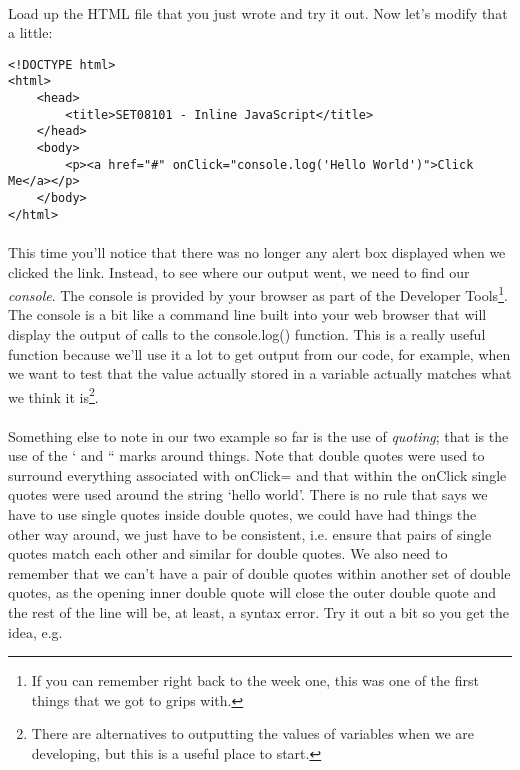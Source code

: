 \documentclass[10pt, a4paper]{article}
\begin{document}
\paragraph{} Load up the HTML file that you just wrote and try it out. Now let's modify that a little:

\begin{lstlisting}
<!DOCTYPE html>
<html>
    <head>
        <title>SET08101 - Inline JavaScript</title>
    </head>
    <body>
        <p><a href="#" onClick="console.log('Hello World')">Click Me</a></p> 
    </body>
</html>
\end{lstlisting}

\paragraph{} This time you'll notice that there was no longer any alert box displayed when we clicked the link. Instead, to see where our output went, we need to find our \emph{console}. The console is provided by your browser as part of the Developer Tools\footnote{If you can remember right back to the week one, this was one of the first things that we got to grips with.}. The console is a bit like a command line built into your web browser that will display the output of calls to the console.log() function. This is a really useful function because we'll use it a lot to get output from our code, for example, when we want to test that the value actually stored in a variable actually matches what we think it is\footnote{There are alternatives to outputting the values of variables when we are developing, but this is a useful place to start.}.

\paragraph{} Something else to note in our two example so far is the use of \emph{quoting}; that is the use of the ` and `` marks around things. Note that double quotes were used to surround everything associated with onClick= and that within the onClick single quotes were used around the string `hello world'. There is no rule that says we have to use single quotes inside double quotes, we could have had things the other way around, we just have to be consistent, i.e. ensure that pairs of single quotes match each other and similar for double quotes. We also need to remember that we can't have a pair of double quotes within another set of double quotes, as the opening inner double quote will close the outer double quote and the rest of the line will be, at least, a syntax error. Try it out a bit so you get the idea, e.g.
\end{document}
